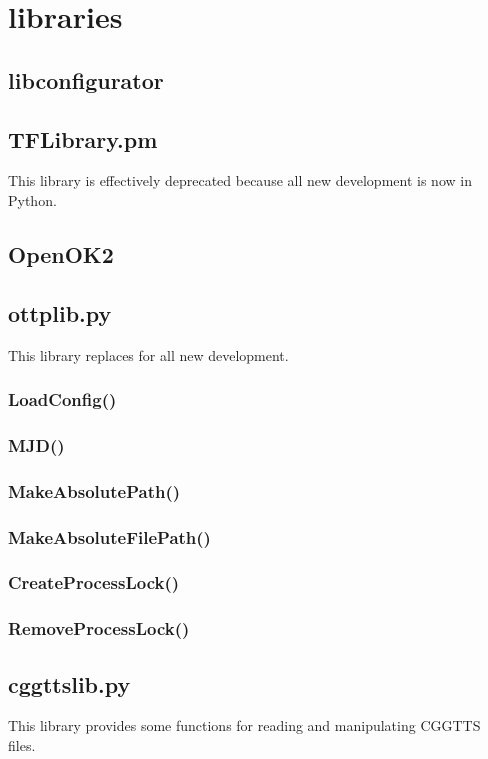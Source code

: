 
\section{libraries}

\subsection{libconfigurator}

\subsection{TFLibrary.pm}

This library is effectively deprecated because all new development is now in Python.

\subsection{OpenOK2}

\subsection{ottplib.py}

This library replaces  for all new development.

\subsubsection{LoadConfig()}

\subsubsection{MJD()}

\subsubsection{MakeAbsolutePath()}

\subsubsection{MakeAbsoluteFilePath()}

\subsubsection{CreateProcessLock()}

\subsubsection{RemoveProcessLock()}

\subsection{cggttslib.py}

This library provides some functions for reading and manipulating CGGTTS files.
